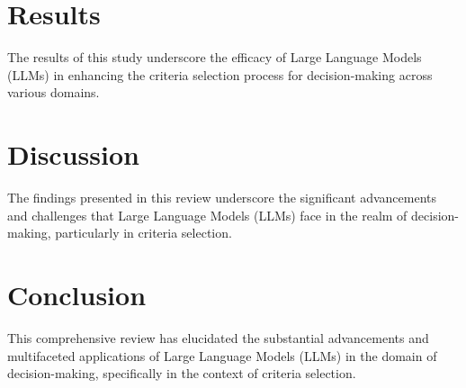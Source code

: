 \documentclass{article}
\begin{document}
\section{Results}
The results of this study underscore the efficacy of Large Language Models (LLMs) in enhancing the criteria selection process for decision-making across various domains.

\section{Discussion}
The findings presented in this review underscore the significant advancements and challenges that Large Language Models (LLMs) face in the realm of decision-making, particularly in criteria selection.

\section{Conclusion}
This comprehensive review has elucidated the substantial advancements and multifaceted applications of Large Language Models (LLMs) in the domain of decision-making, specifically in the context of criteria selection.



\end{document}
